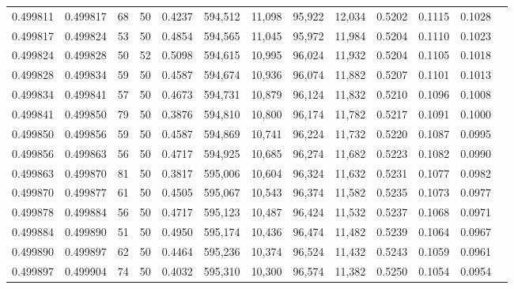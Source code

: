 \begin{tabular}{rrrrrrrrrrrrr}
0.499811 & 0.499817 &    68 &  50 &                                     0.4237 & 594,512 &  11,098 &  95,922 &  12,034 & 0.5202 & 0.1115 & 0.1028 \\
0.499817 & 0.499824 &    53 &  50 &                                     0.4854 & 594,565 &  11,045 &  95,972 &  11,984 & 0.5204 & 0.1110 & 0.1023 \\
0.499824 & 0.499828 &    50 &  52 &                                     0.5098 & 594,615 &  10,995 &  96,024 &  11,932 & 0.5204 & 0.1105 & 0.1018 \\
0.499828 & 0.499834 &    59 &  50 &                                     0.4587 & 594,674 &  10,936 &  96,074 &  11,882 & 0.5207 & 0.1101 & 0.1013 \\
0.499834 & 0.499841 &    57 &  50 &                                     0.4673 & 594,731 &  10,879 &  96,124 &  11,832 & 0.5210 & 0.1096 & 0.1008 \\
0.499841 & 0.499850 &    79 &  50 &                                     0.3876 & 594,810 &  10,800 &  96,174 &  11,782 & 0.5217 & 0.1091 & 0.1000 \\
0.499850 & 0.499856 &    59 &  50 &                                     0.4587 & 594,869 &  10,741 &  96,224 &  11,732 & 0.5220 & 0.1087 & 0.0995 \\
0.499856 & 0.499863 &    56 &  50 &                                     0.4717 & 594,925 &  10,685 &  96,274 &  11,682 & 0.5223 & 0.1082 & 0.0990 \\
0.499863 & 0.499870 &    81 &  50 &                                     0.3817 & 595,006 &  10,604 &  96,324 &  11,632 & 0.5231 & 0.1077 & 0.0982 \\
0.499870 & 0.499877 &    61 &  50 &                                     0.4505 & 595,067 &  10,543 &  96,374 &  11,582 & 0.5235 & 0.1073 & 0.0977 \\
0.499878 & 0.499884 &    56 &  50 &                                     0.4717 & 595,123 &  10,487 &  96,424 &  11,532 & 0.5237 & 0.1068 & 0.0971 \\
0.499884 & 0.499890 &    51 &  50 &                                     0.4950 & 595,174 &  10,436 &  96,474 &  11,482 & 0.5239 & 0.1064 & 0.0967 \\
0.499890 & 0.499897 &    62 &  50 &                                     0.4464 & 595,236 &  10,374 &  96,524 &  11,432 & 0.5243 & 0.1059 & 0.0961 \\
0.499897 & 0.499904 &    74 &  50 &                                     0.4032 & 595,310 &  10,300 &  96,574 &  11,382 & 0.5250 & 0.1054 & 0.0954 \\

\end{tabular}
